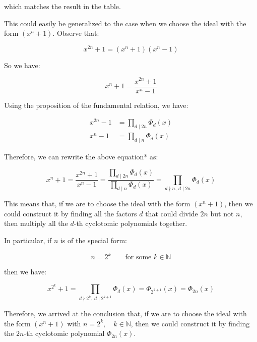 \documentclass[12pt]{article}
\begin{document}
which matches the result in the table.

This could easily be generalized to the case when we choose the ideal with the form $(x^n + 1)$.
Observe that:

\begin{equation*}
    x^{2n} + 1 = (x^n + 1)(x^n - 1)
\end{equation*}

So we have:

\begin{equation*}
    x^n + 1 = \frac{x^{2n} + 1}{x^n - 1}
\end{equation*}

Using the proposition of the fundamental relation, we have:

\begin{align*}
    x^{2n} - 1 &= \prod_{d \mid 2n} \Phi_d(x) \\
    x^n - 1 &= \prod_{d \mid n} \Phi_d(x) 
\end{align*}

Therefore, we can rewrite the above equation* as:

\begin{equation*}
    x^n + 1 
    = \frac{x^{2n} + 1}{x^n - 1} 
    = \frac{\prod_{d \mid 2n} \Phi_d(x)}{\prod_{d \mid n} \Phi_d(x)}
    = \prod_{d \nmid n, \ d \mid 2n} \Phi_d(x)
\end{equation*}

This means that, if we are to choose the ideal with the form $(x^n + 1)$, 
then we could construct it by finding all the factors $d$ that could divide $2n$ but not $n$, 
then multiply all the $d$-th cyclotomic polynomials together.

In particular, if $n$ is of the special form:

\begin{equation*}
    n = 2^k \qquad \text{for some } k \in \mathbb{N}
\end{equation*}

then we have:

\begin{equation*}
    x^{2^k} + 1 
    = \prod_{d \nmid 2^k, \ d \mid 2^{k+1}} \Phi_d(x)
    = \Phi_{2^{k+1}}(x)
    = \Phi_{2n}(x)
\end{equation*}

Therefore, we arrived at the conclusion that, 
if we are to choose the ideal with the form $(x^n + 1)$ with $n = 2^k, \quad k \in \mathbb{N}$, 
then we could construct it by finding the $2n$-th cyclotomic polynomial $\Phi_{2n}(x)$.
\end{document}
